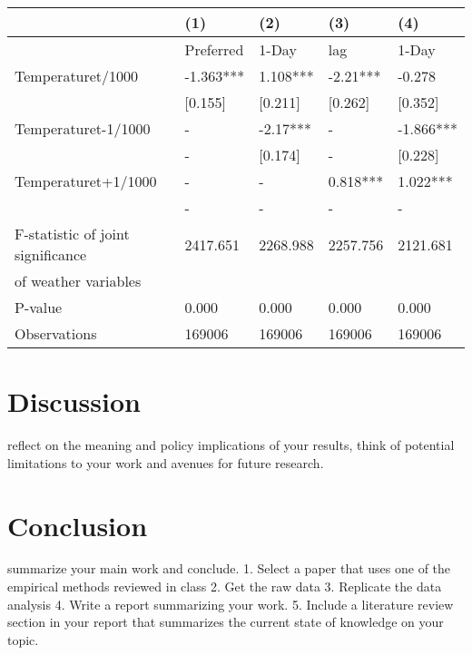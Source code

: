 \documentclass[11pt]{article}
\begin{document}
\begin{tabular}{lllll}
	\toprule
	{} &        (1) &       (2) &       (3) &        (4) \\
	\midrule
	&  Preferred &     1-Day &       lag &      1-Day \\
	Temperaturet/1000                 &  -1.363*** &  1.108*** &  -2.21*** &     -0.278 \\
	&    [0.155] &   [0.211] &   [0.262] &    [0.352] \\
	Temperaturet-1/1000               &          - &  -2.17*** &         - &  -1.866*** \\
	&          - &   [0.174] &         - &    [0.228] \\
	Temperaturet+1/1000               &          - &         - &  0.818*** &   1.022*** \\
	&          - &         - &         - &          - \\
	F-statistic of joint significance &   2417.651 &  2268.988 &  2257.756 &   2121.681 \\
	of weather variables              &            &           &           &            \\
	P-value                           &      0.000 &     0.000 &     0.000 &      0.000 \\
	\midrule
	Observations                      &     169006 &    169006 &    169006 &     169006 \\
	\bottomrule
\end{tabular}


\section{Discussion}
reflect on the meaning and policy implications of your results, think of potential
limitations to your work and avenues for future research.
\section{ Conclusion}
summarize your main work and conclude.
1. Select a paper that uses one of the empirical methods reviewed in class
2. Get the raw data
3. Replicate the data analysis
4. Write a report summarizing your work.
5. Include a literature review section in your report that summarizes the current state
of knowledge on your topic.
\end{document}
